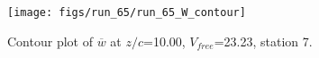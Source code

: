 \begin{figure}[H]
\centering
\texttt{[image: figs/run\_65/run\_65\_W\_contour]}
\caption{Contour plot of $\overline{w}$ at $z/c$=10.00, $V_{free}$=23.23, station 7.}
\label{fig:run_65_W_contour}
\end{figure}


